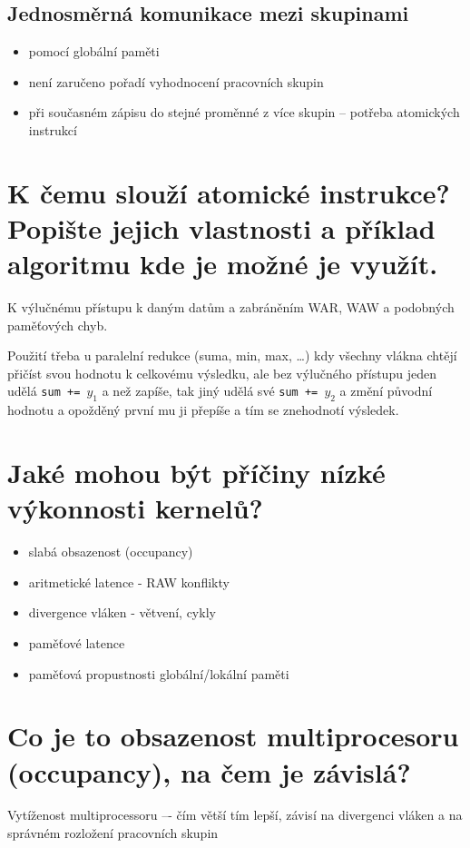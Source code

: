 	\subsection*{Jednosměrná komunikace mezi skupinami}
	\begin{itemize}
		\setlength\itemsep{0em}
		\item pomocí globální paměti
		\item není zaručeno pořadí vyhodnocení pracovních skupin
		\item při současném zápisu do stejné proměnné z více skupin -- potřeba atomických instrukcí
	\end{itemize}


\section{K čemu slouží atomické instrukce? Popište jejich vlastnosti a příklad algoritmu kde je možné je využít.}
	\label{sec:atomicke_instrukce}
	K výlučnému přístupu k daným datům a zabráněním WAR, WAW a podobných paměťových chyb. 
	
	Použití třeba u paralelní redukce (suma, min, max, \dots) kdy všechny vlákna chtějí přičíst svou hodnotu k celkovému výsledku, ale bez výlučného přístupu jeden udělá \texttt{sum += $y_1$} a než zapíše, tak jiný udělá své \texttt{sum += $y_2$} a změní původní hodnotu a opožděný první mu ji přepíše a tím se znehodnotí výsledek.
	

\section{Jaké mohou být příčiny nízké výkonnosti kernelů?}
	\begin{itemize}
		\setlength\itemsep{0em}
		\item slabá obsazenost (occupancy)
		\item aritmetické latence - RAW konflikty
		\item divergence vláken - větvení, cykly
		\item paměťové latence
		\item paměťová propustnosti globální/lokální paměti
	\end{itemize}


\section{Co je to obsazenost multiprocesoru (occupancy), na čem je závislá?}
	Vytíženost multiprocessoru –- čím větší tím lepší, závisí na divergenci vláken a na správném rozložení pracovních skupin
	
